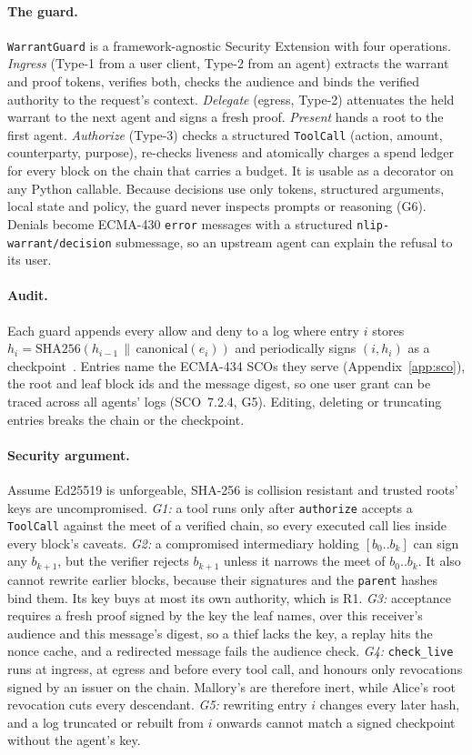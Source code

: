 \documentclass[sigconf,nonacm]{acmart}
\newcommand{\code}[1]{\texttt{\small #1}}
\begin{document}
\paragraph{The guard.} \code{WarrantGuard} is a framework-agnostic Security Extension with four operations. \emph{Ingress} (Type-1 from a user client, Type-2 from an agent) extracts the warrant and proof tokens, verifies both, checks the audience and binds the verified authority to the request's context. \emph{Delegate} (egress, Type-2) attenuates the held warrant to the next agent and signs a fresh proof. \emph{Present} hands a root to the first agent. \emph{Authorize} (Type-3) checks a structured \code{ToolCall} (action, amount, counterparty, purpose), re-checks liveness and atomically charges a spend ledger for every block on the chain that carries a budget. It is usable as a decorator on any Python callable. Because decisions use only tokens, structured arguments, local state and policy, the guard never inspects prompts or reasoning (G6). Denials become ECMA-430 \code{error} messages with a structured \code{nlip-warrant/decision} submessage, so an upstream agent can explain the refusal to its user.

\paragraph{Audit.} Each guard appends every allow and deny to a log where entry $i$ stores $h_i=\mathrm{SHA256}(h_{i-1}\,\|\,\mathrm{canonical}(e_i))$ and periodically signs $(i,h_i)$ as a checkpoint~\cite{schneier1999,crosby2009}. Entries name the ECMA-434 SCOs they serve (Appendix~\ref{app:sco}), the root and leaf block ids and the message digest, so one user grant can be traced across all agents' logs (SCO~7.2.4, G5). Editing, deleting or truncating entries breaks the chain or the checkpoint.

\paragraph{Security argument.} Assume Ed25519 is unforgeable, SHA-256 is collision resistant and trusted roots' keys are uncompromised. \emph{G1:} a tool runs only after \code{authorize} accepts a \code{ToolCall} against the meet of a verified chain, so every executed call lies inside every block's caveats. \emph{G2:} a compromised intermediary holding $[b_0..b_{k}]$ can sign any $b_{k+1}$, but the verifier rejects $b_{k+1}$ unless it narrows the meet of $b_0..b_k$. It also cannot rewrite earlier blocks, because their signatures and the \code{parent} hashes bind them. Its key buys at most its own authority, which is R1. \emph{G3:} acceptance requires a fresh proof signed by the key the leaf names, over this receiver's audience and this message's digest, so a thief lacks the key, a replay hits the nonce cache, and a redirected message fails the audience check. \emph{G4:} \code{check\_live} runs at ingress, at egress and before every tool call, and honours only revocations signed by an issuer on the chain. Mallory's are therefore inert, while Alice's root revocation cuts every descendant. \emph{G5:} rewriting entry $i$ changes every later hash, and a log truncated or rebuilt from $i$ onwards cannot match a signed checkpoint without the agent's key.
\end{document}
